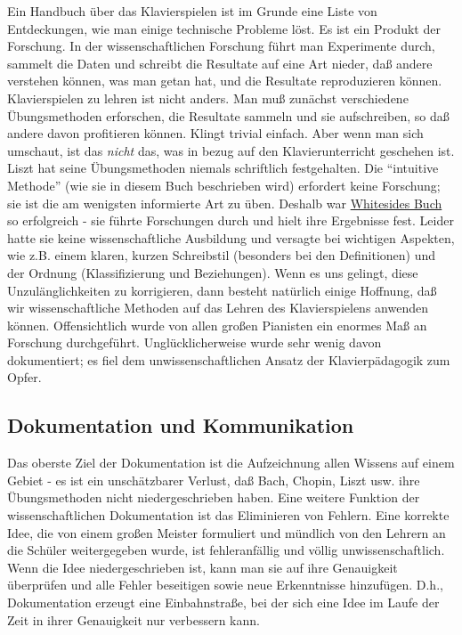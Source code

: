 Ein Handbuch über das Klavierspielen ist im Grunde eine Liste von Entdeckungen, wie man einige technische Probleme löst.
 Es ist ein Produkt der Forschung.
 In der wissenschaftlichen Forschung führt man Experimente durch, sammelt die Daten und schreibt die Resultate auf eine Art nieder, daß andere verstehen können, was man getan hat, und die Resultate reproduzieren können.
 Klavierspielen zu lehren ist nicht anders.
 Man muß zunächst verschiedene Übungsmethoden erforschen, die Resultate sammeln und sie aufschreiben, so daß andere davon profitieren können.
 Klingt trivial einfach.
 Aber wenn man sich umschaut, ist das \textit{nicht} das, was in bezug auf den Klavierunterricht geschehen ist.
 Liszt hat seine Übungsmethoden niemals schriftlich festgehalten.
 Die \enquote{intuitive Methode} (wie sie in diesem Buch beschrieben wird) erfordert keine Forschung; sie ist die am wenigsten informierte Art zu üben.
 Deshalb war \hyperlink{Whiteside}{Whitesides Buch} so erfolgreich - sie führte Forschungen durch und hielt ihre Ergebnisse fest.
 Leider hatte sie keine wissenschaftliche Ausbildung und versagte bei wichtigen Aspekten, wie z.B. einem klaren, kurzen Schreibstil (besonders bei den Definitionen) und der Ordnung (Klassifizierung und Beziehungen).
 Wenn es uns gelingt, diese Unzulänglichkeiten zu korrigieren, dann besteht natürlich einige Hoffnung, daß wir wissenschaftliche Methoden auf das Lehren des Klavierspielens anwenden können.
 Offensichtlich wurde von allen großen Pianisten ein enormes Maß an Forschung durchgeführt.
 Unglücklicherweise wurde sehr wenig davon dokumentiert; es fiel dem unwissenschaftlichen Ansatz der Klavierpädagogik zum Opfer.
 \hypertarget{c3_3d}{}

\subsection{Dokumentation und Kommunikation}

Das oberste Ziel der Dokumentation ist die Aufzeichnung allen Wissens auf einem Gebiet - es ist ein unschätzbarer Verlust, daß Bach, Chopin, Liszt usw. ihre Übungsmethoden nicht niedergeschrieben haben.
 Eine weitere Funktion der wissenschaftlichen Dokumentation ist das Eliminieren von Fehlern.
 Eine korrekte Idee, die von einem großen Meister formuliert und mündlich von den Lehrern an die Schüler weitergegeben wurde, ist fehleranfällig und völlig unwissenschaftlich.
 Wenn die Idee niedergeschrieben ist, kann man sie auf ihre Genauigkeit überprüfen und alle Fehler beseitigen sowie neue Erkenntnisse hinzufügen.
 D.h., Dokumentation erzeugt eine Einbahnstraße, bei der sich eine Idee im Laufe der Zeit in ihrer Genauigkeit nur verbessern kann.
 

